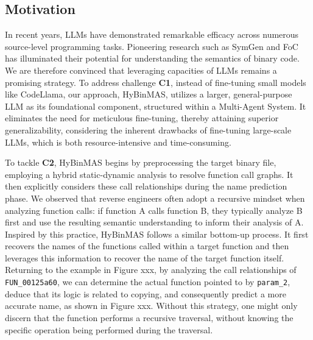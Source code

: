 \documentclass[acmsmall,screen,review,anonymous]{acmart} %
\begin{document}
\subsection{Motivation}

In recent years, LLMs have demonstrated remarkable efficacy across numerous source-level programming tasks. Pioneering research such as SymGen and FoC has illuminated their potential for understanding the semantics of binary code. We are therefore convinced that leveraging capacities of LLMs remains a promising strategy. To address challenge \textbf{C1}, instead of fine-tuning small models like CodeLlama, our approach, HyBinMAS, utilizes a larger, general-purpose LLM as its foundational component, structured within a Multi-Agent System. It eliminates the need for meticulous fine-tuning, thereby attaining superior generalizability, considering the inherent drawbacks of fine-tuning large-scale LLMs, which is both resource-intensive and time-consuming.

To tackle \textbf{C2}, HyBinMAS begins by preprocessing the target binary file, employing a hybrid static-dynamic analysis to resolve function call graphs. It then explicitly considers these call relationships during the name prediction phase. We observed that reverse engineers often adopt a recursive mindset when analyzing function calls: if function A calls function B, they typically analyze B first and use the resulting semantic understanding to inform their analysis of A. Inspired by this practice, HyBinMAS follows a similar bottom-up process. It first recovers the names of the functions called within a target function and then leverages this information to recover the name of the target function itself. Returning to the example in Figure xxx, by analyzing the call relationships of \lstinline{FUN_00125a60}, we can determine the actual function pointed to by \lstinline{param_2}, deduce that its logic is related to copying, and consequently predict a more accurate name, as shown in Figure xxx. Without this strategy, one might only discern that the function performs a recursive traversal, without knowing the specific operation being performed during the traversal.
\end{document}
